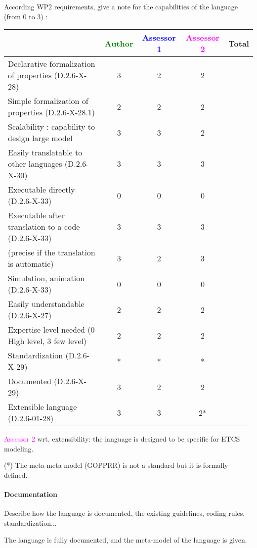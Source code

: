 According WP2 requirements, give a note for the capabilities of the language (from 0 to 3) :

\begin{tabular}{|l | c | c | c | c|}
  \hline
  & \textcolor{green}{Author} & \textcolor{blue}{Assessor 1} & \textcolor{magenta}{Assessor 2} & Total \\
  \hline
  Declarative formalization of properties (D.2.6-X-28) &3 &2 & 2& \\
  \hline
  Simple formalization of properties (D.2.6-X-28.1) &2 &2 & 2& \\
  \hline
  Scalability : capability to design large model &3 &3 & 2& \\
  \hline
  Easily translatable to other languages (D.2.6-X-30) &3 &3 & 3& \\
  \hline
  Executable directly (D.2.6-X-33) &0 &0 & 0& \\
  \hline
  Executable after translation to a code (D.2.6-X-33) &3 &3 & 3& \\
  (precise if the translation is automatic) &3 &2 & 3& \\
  \hline
  Simulation, animation (D.2.6-X-33) &0 &0 & 0& \\
  \hline
  Easily understandable (D.2.6-X-27) &2 &2 & 2& \\
  \hline
  Expertise level needed (0 High level, 3 few level) &2 &2 & 2& \\
  \hline
  Standardization (D.2.6-X-29) &* &* & *& \\
  \hline
  Documented (D.2.6-X-29) &3 &2 & 2& \\
  \hline
  Extensible language (D.2.6-01-28) &3 &3 & 2*& \\
  \hline
\end{tabular}

\textcolor{magenta}{Assessor 2} wrt. extensibility: the language is designed to
be specific for ETCS modeling.

\begin{author_comment}
(*) The meta-meta model (GOPPRR) is not a standard but it is formally defined.
\end{author_comment}

\paragraph{Documentation} Describe how the language is documented, the existing guidelines, coding rules, standardization...

The language is fully documented, and the meta-model of the language
is given.

